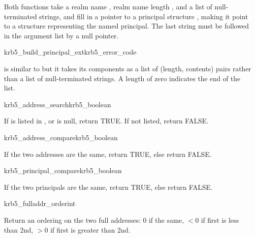 Both functions take a realm name , realm name length
, and a list of null-terminated strings, and fill in a
pointer to a principal structure , making it point to a
structure representing the named principal.
The last string must be followed in the argument list by a null pointer.


\begin{funcdecl}{krb5_build_principal_ext}{krb5_error_code}{\funcout}
\funcin
{}
\end{funcdecl}

 is similar to
 but it takes its components as a list of
(length, contents) pairs rather than a list of null-terminated strings.
A length of zero indicates the end of the list.

\begin{funcdecl}{krb5_address_search}{krb5_boolean}{\funcin}
\end{funcdecl}

If  is listed in , or
 is null, return TRUE.  If not listed, return FALSE.

\begin{funcdecl}{krb5_address_compare}{krb5_boolean}{\funcin}
\end{funcdecl}

If the two addresses are the same, return TRUE, else return FALSE.

\begin{funcdecl}{krb5_principal_compare}{krb5_boolean}{\funcin}
\end{funcdecl}

If the two principals are the same, return TRUE, else return FALSE.

\begin{funcdecl}{krb5_fulladdr_order}{int}{\funcin}
\end{funcdecl}

Return an ordering on the two full addresses:  0 if the same,
$< 0$ if first is less than 2nd, $> 0$ if first is greater than 2nd.

